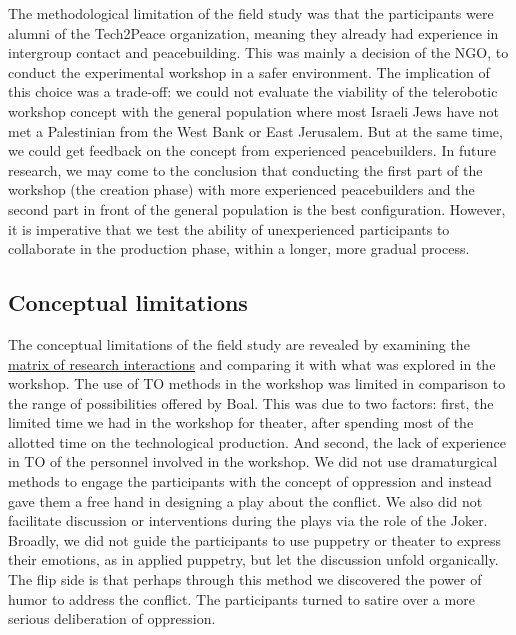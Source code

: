 \documentclass[dissertation,math,vertlayout,pdfa,colorlinks]{aaltoseries}
\begin{document}
The methodological limitation of the field study was that the participants were alumni of the Tech2Peace organization, meaning they already had experience in intergroup contact and peacebuilding. This was mainly a decision of the NGO, to conduct the experimental workshop in a safer environment. The implication of this choice was a trade-off: we could not evaluate the viability of the telerobotic workshop concept with the general population where most Israeli Jews have not met a Palestinian from the West Bank or East Jerusalem. But at the same time, we could get feedback on the concept from experienced peacebuilders. In future research, we may come to the conclusion that conducting the first part of the workshop (the creation phase) with more experienced peacebuilders and the second part in front of the general population is the best configuration. However, it is imperative that we test the ability of unexperienced participants to collaborate in the production phase, within a longer, more gradual process.

\subsection{Conceptual limitations}
The conceptual limitations of the field study are revealed by examining the \hyperref[sec:matrix_of_intersections]{matrix of research interactions} and comparing it with what was explored in the workshop. The use of TO methods in the workshop was limited in comparison to the range of possibilities offered by Boal. This was due to two factors: first, the limited time we had in the workshop for theater, after spending most of the allotted time on the technological production. And second, the lack of experience in TO of the personnel involved in the workshop. We did not use dramaturgical methods to engage the participants with the concept of oppression and instead gave them a free hand in designing a play about the conflict. We also did not facilitate discussion or interventions during the plays via the role of the Joker. Broadly, we did not guide the participants to use puppetry or theater to express their emotions, as in applied puppetry, but let the discussion unfold organically. The flip side is that perhaps through this method we discovered the power of humor to address the conflict. The participants turned to satire over a more serious deliberation of oppression. 
\end{document}
